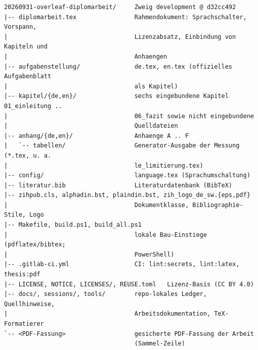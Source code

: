 {\footnotesize
\begin{verbatim}
20260931-overleaf-diplomarbeit/     Zweig development @ d32cc492
|-- diplomarbeit.tex                Rahmendokument: Sprachschalter, Vorspann,
|                                   Lizenzabsatz, Einbindung von Kapiteln und
|                                   Anhaengen
|-- aufgabenstellung/               de.tex, en.tex (offizielles Aufgabenblatt
|                                   als Kapitel)
|-- kapitel/{de,en}/                sechs eingebundene Kapitel 01_einleitung ..
|                                   06_fazit sowie nicht eingebundene
|                                   Quelldateien
|-- anhang/{de,en}/                 Anhaenge A .. F
|   `-- tabellen/                   Generator-Ausgabe der Messung (*.tex, u. a.
|                                   le_limitierung.tex)
|-- config/                         language.tex (Sprachumschaltung)
|-- literatur.bib                   Literaturdatenbank (BibTeX)
|-- zihpub.cls, alphadin.bst, plaindin.bst, zih_logo_de_sw.{eps,pdf}
|                                   Dokumentklasse, Bibliographie-Stile, Logo
|-- Makefile, build.ps1, build_all.ps1
|                                   lokale Bau-Einstiege (pdflatex/bibtex;
|                                   PowerShell)
|-- .gitlab-ci.yml                  CI: lint:secrets, lint:latex, thesis:pdf
|-- LICENSE, NOTICE, LICENSES/, REUSE.toml   Lizenz-Basis (CC BY 4.0)
|-- docs/, sessions/, tools/        repo-lokales Ledger, Quellhinweise,
|                                   Arbeitsdokumentation, TeX-Formatierer
`-- <PDF-Fassung>                   gesicherte PDF-Fassung der Arbeit
                                    (Sammel-Zeile)
\end{verbatim}
}

